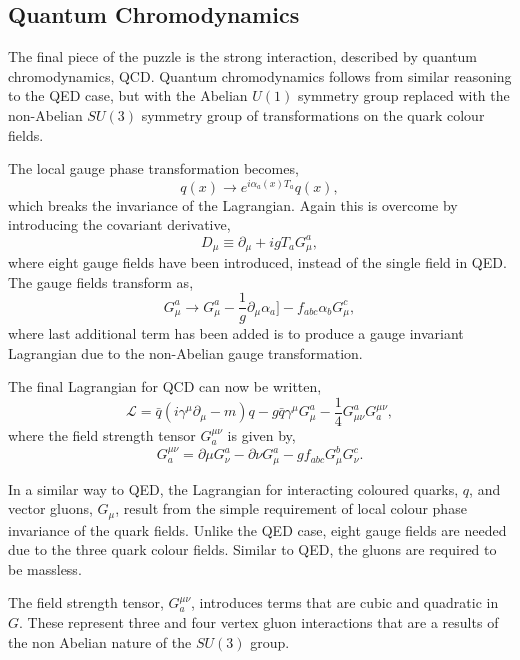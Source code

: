 \subsection{Quantum Chromodynamics}
\label{sec:QCD}
The final piece of the puzzle is the strong interaction, described by quantum
chromodynamics, QCD. 
Quantum chromodynamics follows from similar reasoning to the QED case, but with
the Abelian $U(1)$ symmetry group replaced with the non-Abelian $SU(3)$ symmetry
group of transformations on the quark colour fields.

The local gauge phase transformation becomes,
\begin{equation}
q(x) \to e^{i\alpha_a(x)T_a} q(x),
\end{equation}
which breaks the invariance of the Lagrangian. Again this is overcome by
introducing the covariant derivative,
\begin{equation}
D_{\mu} \equiv \partial_{\mu} + i g T_{a} G_{\mu}^{a},
\end{equation}
where eight gauge fields have been introduced, instead of the single field in
QED.  
The gauge fields transform as,
\begin{equation}
 G_{\mu}^{a} \to G_{\mu}^{a} 
-\frac{1}{g}\partial_{\mu}\alpha_{a}]
-f_{abc}\alpha_{b}G^{c}_{\mu},
\end{equation}
where last additional term has been added is to produce a gauge invariant
Lagrangian due to the non-Abelian gauge transformation.

The final Lagrangian for QCD can now be written,
\begin{equation}
\mathcal{L} = 
\bar{q}(i\gamma^{\mu}\partial_{\mu} - m)q -
g \bar{q} \gamma^{\mu} G_{\mu}^{a} - 
\frac{1}{4} G_{\mu\nu}^{a} G^{\mu\nu}_{a},
\end{equation}
where the field strength tensor $G^{\mu\nu}_{a}$ is given by,
\begin{equation}
G^{\mu\nu}_{a} 
= \partial{\mu} G^{a}_{\nu}
- \partial{\nu} G^{a}_{\mu}
-g f_{abc} G^{b}_{\mu} G^{c}_{\nu}.
\end{equation}

In a similar way to QED, the Lagrangian for interacting coloured quarks, $q$, and
vector gluons, $G_{\mu}$, result from the simple requirement of local colour
phase invariance of the quark fields. Unlike the QED case, eight gauge fields
are needed due to the three quark colour fields.  Similar to QED, the gluons are
required to  be massless.

The field strength tensor, $G^{\mu\nu}_{a}$, introduces terms that are cubic and
quadratic in $G$. These represent three and four vertex gluon interactions that
are a results of the non Abelian nature of the $SU(3)$ group.

